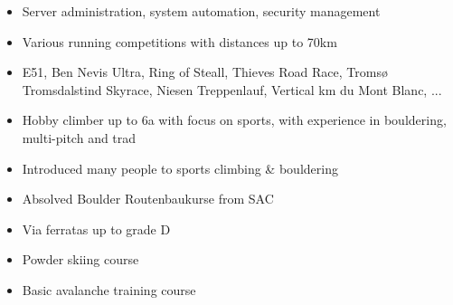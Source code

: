 \documentclass[10pt,a4paper]{altacv}
\begin{document}
    \begin{itemize}
      \item Server administration, system automation, security management
    \end{itemize}
  \divider




\begin{itemize}
  \item{Various running competitions with distances up to 70km}
  \item{E51, Ben Nevis Ultra, Ring of Steall, Thieves Road Race, Tromsø Tromsdalstind Skyrace, Niesen Treppenlauf, Vertical km du Mont Blanc, ...}
\end{itemize}
\divider

\begin{itemize}
  \item {Hobby climber up to 6a with focus on sports, with experience in bouldering, multi-pitch and trad}
  \item {Introduced many people to sports climbing \& bouldering}
  \item {Absolved Boulder Routenbaukurse from SAC}
  \item {Via ferratas up to grade D}
\end{itemize}
\divider

\begin{itemize}
  \item{Powder skiing course}
  \item{Basic avalanche training course}

\end{itemize}
\divider
\end{document}
